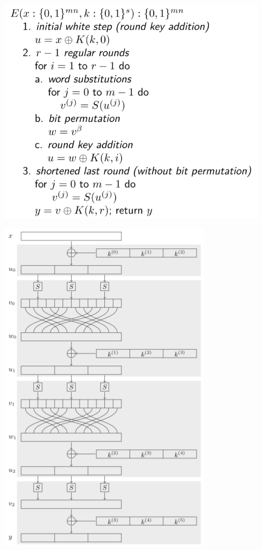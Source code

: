 \begin{minipage}{.6\linewidth}
    \includegraphics[width=\linewidth]{img/spcs}
\end{minipage}
\begin{minipage}{.35\linewidth}
    \includegraphics[width=\linewidth]{img/spcs_vis}
\end{minipage}

